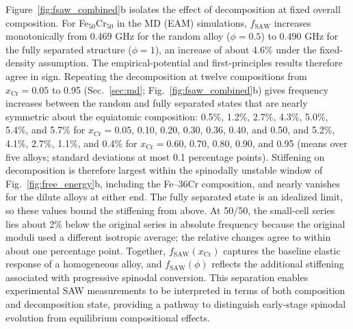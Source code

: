 \documentclass[final,3p,times]{elsarticle}
\begin{document}
Figure~\ref{fig:fsaw_combined}b isolates the effect of decomposition at fixed overall composition. For Fe$_{50}$Cr$_{50}$ in the MD (EAM) simulations, $f_{\mathrm{SAW}}$ increases monotonically from 0.469 GHz for the random alloy ($\phi=0.5$) to 0.490 GHz for the fully separated structure ($\phi=1$), an increase of about 4.6\% under the fixed-density assumption. The empirical-potential and first-principles results therefore agree in sign. Repeating the decomposition at twelve compositions from $x_{\mathrm{Cr}}=0.05$ to 0.95 (Sec.~\ref{sec:md}; Fig.~\ref{fig:fsaw_combined}b) gives frequency increases between the random and fully separated states that are nearly symmetric about the equiatomic composition: 0.5\%, 1.2\%, 2.7\%, 4.3\%, 5.0\%, 5.4\%, and 5.7\% for $x_{\mathrm{Cr}}=0.05$, 0.10, 0.20, 0.30, 0.36, 0.40, and 0.50, and 5.2\%, 4.1\%, 2.7\%, 1.1\%, and 0.4\% for $x_{\mathrm{Cr}}=0.60$, 0.70, 0.80, 0.90, and 0.95 (means over five alloys; standard deviations at most 0.1 percentage points). Stiffening on decomposition is therefore largest within the spinodally unstable window of Fig.~\ref{fig:free_energy}b, including the Fe--36Cr composition, and nearly vanishes for the dilute alloys at either end. The fully separated state is an idealized limit, so these values bound the stiffening from above. At 50/50, the small-cell series lies about 2\% below the original series in absolute frequency because the original moduli used a different isotropic average; the relative changes agree to within about one percentage point. Together, $f_{\mathrm{SAW}}(x_{\mathrm{Cr}})$ captures the baseline elastic response of a homogeneous alloy, and $f_{\mathrm{SAW}}(\phi)$ reflects the additional stiffening associated with progressive spinodal conversion. This separation enables experimental SAW measurements to be interpreted in terms of both composition and decomposition state, providing a pathway to distinguish early-stage spinodal evolution from equilibrium compositional effects.
\end{document}
